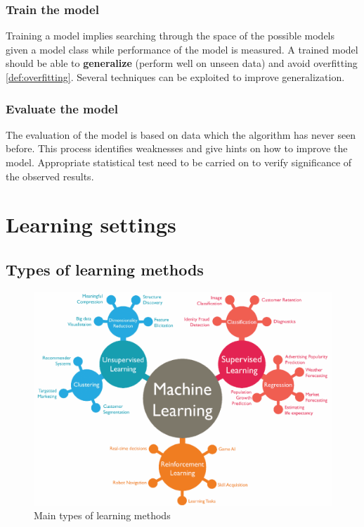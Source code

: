     \subsubsection*{Train the model}
        Training a model implies searching through the space of the possible models given a model class while performance of the model is measured. A trained model should be able to \textbf{generalize} (perform well on unseen data) and avoid overfitting \ref{def:overfitting}.
        Several techniques can be exploited to improve generalization.
        
    \subsubsection*{Evaluate the model}
        The evaluation of the model is based on data which the algorithm has never seen before. This process identifies weaknesses and give hints on how to improve the model. 
        Appropriate statistical test need to be carried on to verify significance of the observed results. 

\section{Learning settings}
    
    \subsection{Types of learning methods}
        \begin{figure}
            \centering
            \includegraphics[width=\textwidth]{images/algoritmi-machine-learning.png}
            \caption{Main types of learning methods}
            \label{learning_methods_fig}
        \end{figure}
        
